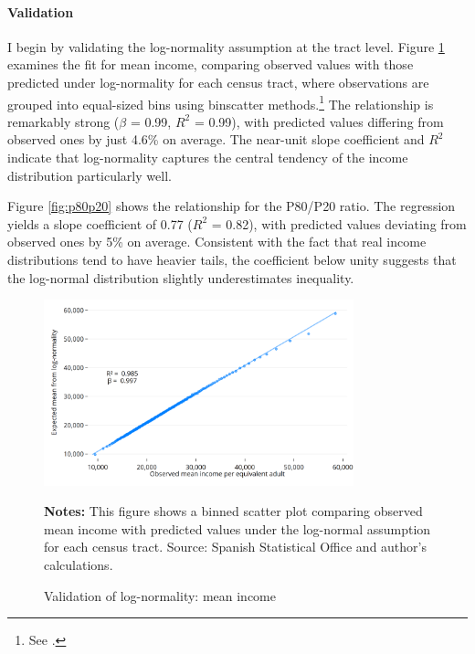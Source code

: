 
\paragraph{Validation} I begin by validating the log-normality assumption at the tract level. Figure \ref{fig:median} examines the fit for mean income, comparing observed values with those predicted under log-normality for each census tract, where observations are grouped into equal-sized bins using binscatter methods.\footnote{See \cite{cattaneo}.} The relationship is remarkably strong ($\beta$ = 0.99, $R^2$ = 0.99), with predicted values differing from observed ones by just 4.6\% on average. The near-unit slope coefficient and $R^2$ indicate that log-normality captures the central tendency of the income distribution particularly well.

Figure \ref{fig:p80p20} shows the relationship for the P80/P20 ratio. The regression yields a slope coefficient of 0.77 ($R^2$ = 0.82), with predicted values deviating from observed ones by 5\% on average. Consistent with the fact that real income distributions tend to have heavier tails, the coefficient below unity suggests that the log-normal distribution slightly underestimates inequality.

\begin{figure}[H]
\begin{center}
\captionsetup{justification=centering}
\caption{Validation of log-normality: mean income}
\label{fig:median}
\includegraphics[width=0.8\textwidth]{output/binned_scatter_mean_2023.png}
\end{center}
\begin{fignotes2}
\textbf{Notes:} This figure shows a binned scatter plot comparing observed mean income with predicted values under the log-normal assumption for each census tract. Source: Spanish Statistical Office and author's calculations.
\end{fignotes2}
\end{figure}

